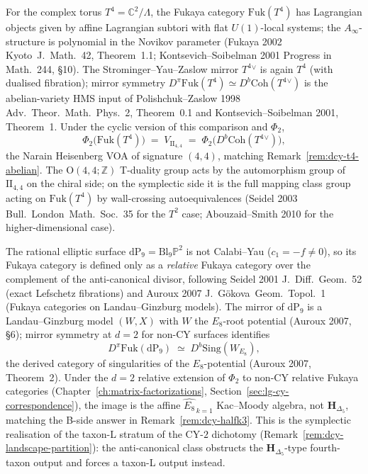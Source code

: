 \begin{remark}
\label{rem:fukaya-t4}
For the complex torus $T^4 = \mathbb{C}^2/\Lambda$, the
Fukaya category $\mathrm{Fuk}(T^4)$ has Lagrangian objects given
by affine Lagrangian subtori with flat $U(1)$-local systems; the
$A_\infty$-structure is polynomial in the Novikov parameter
(Fukaya 2002 \textup{Kyoto~J.~Math.}~42, Theorem~1.1; Kontsevich--Soibelman
2001 \textup{Progress in Math.}~244, \S10). The Strominger--Yau--Zaslow
mirror $T^4{}^\vee$ is again $T^4$ (with dualised fibration);
mirror symmetry
$D^\pi\mathrm{Fuk}(T^4)\simeq D^b\mathrm{Coh}(T^4{}^\vee)$ is the
abelian-variety HMS input of Polishchuk--Zaslow 1998
\textup{Adv.~Theor.~Math.~Phys.}~2, Theorem~0.1 and
Kontsevich--Soibelman 2001, Theorem~1. Under the cyclic version of
this comparison and $\Phi_2$,
\[
 \Phi_2\bigl(\mathrm{Fuk}(T^4)\bigr)
 \;=\;
 V_{\mathrm{II}_{4,4}}
 \;=\;
 \Phi_2\bigl(D^b\mathrm{Coh}(T^4{}^\vee)\bigr),
\]
the Narain Heisenberg VOA of signature $(4,4)$, matching
Remark~\ref{rem:dcy-t4-abelian}. The
$\mathrm{O}(4,4;\mathbb{Z})$ T-duality group acts by the
automorphism group of $\mathrm{II}_{4,4}$ on the chiral side; on
the symplectic side it is the full mapping class group
acting on $\mathrm{Fuk}(T^4)$ by wall-crossing autoequivalences
(Seidel 2003 \textup{Bull.~London~Math.~Soc.}~35 for the $T^2$
case; Abouzaid--Smith 2010 for the higher-dimensional case).
\end{remark}

\begin{remark}
\label{rem:fukaya-halfk3}
The rational elliptic surface
$\mathrm{dP}_9 = \mathrm{Bl}_9\mathbb{P}^2$ is not Calabi--Yau
($c_1 = -f\ne 0$), so its Fukaya category is defined only as a
\emph{relative} Fukaya category over the complement of the
anti-canonical divisor, following Seidel 2001
\textup{J.~Diff.~Geom.}~52 (exact Lefschetz fibrations) and
Auroux 2007 \textup{J.~G\"okova~Geom.~Topol.}~1 (Fukaya categories
on Landau--Ginzburg models). The mirror of $\mathrm{dP}_9$ is a
Landau--Ginzburg model $(W, X)$ with $W$ the $E_8$-root
potential (Auroux 2007, \S 6); mirror symmetry at $d = 2$ for
non-CY surfaces identifies
\[
 D^\pi\mathrm{Fuk}(\mathrm{dP}_9)
 \;\simeq\;
 D^b\mathrm{Sing}(W_{E_8}),
\]
the derived category of singularities of the $E_8$-potential
(Auroux 2007, Theorem~2). Under the $d=2$ relative extension of
$\Phi_2$ to non-CY relative Fukaya categories
(Chapter~\ref{ch:matrix-factorizations},
Section~\ref{sec:lg-cy-correspondence}), the image is the affine
$\widehat{E_8}_{\,k=1}$ Kac--Moody algebra, not
$\mathbf{H}_{\Delta_5}$, matching the B-side answer in
Remark~\ref{rem:dcy-halfk3}. This is the symplectic
realisation of the taxon-L stratum of the CY-$2$ dichotomy
(Remark~\ref{rem:dcy-landscape-partition}): the
anti-canonical class obstructs the $\mathbf{H}_{\Delta_5}$-type
fourth-taxon output and forces a taxon-L output instead.
\end{remark}


